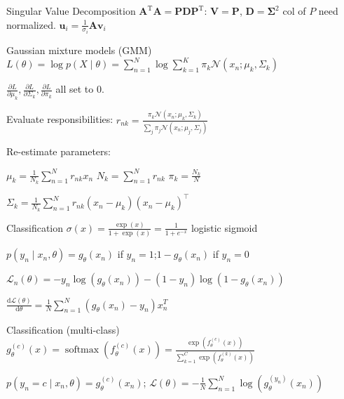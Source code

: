\documentclass[UTF8,a4paper]{article}
\begin{document}
\begin{multicols}{3}
\begin{cheatsheetblock}{Singular Value Decomposition}
    $\bm{A}^{\mathrm{T}} \bm{A}=\bm{P} \bm{D} \bm{P}^{\mathrm{T}}$: \hfill $\bm{V} = \bm{P}$, $\bm{D} = \bm{\Sigma}^2$ \hfill col of $P$ need normalized.
    $\bm{u}_i = \frac{1}{\sigma_i} \bm{A} \bm{v}_i$

\end{cheatsheetblock}

\begin{cheatsheetblock}{Gaussian mixture models (GMM)}
    $L(\theta)=\log p(X \mid \theta)=\sum_{n=1}^N \log \sum_{k=1}^K \pi_k \mathcal{N}\left(x_n ; \mu_k, \Sigma_k\right)$

    $\frac{\partial L}{\partial \mu_k}, \frac{\partial L}{\partial \Sigma_k} , \frac{\partial L}{\partial \pi_k}$ all set to 0.

    Evaluate responsibilities: \quad $r_{n k}=\frac{\pi_k \mathcal{N}\left(x_n ; \mu_k, \Sigma_k\right)}{\sum_j \pi_j \mathcal{N}\left(x_n ; \mu_j, \Sigma_j\right)}$

    Re-estimate parameters:

    $\mu_k=\frac{1}{N_k} \sum_{n=1}^N r_{n k} x_n$ \hfill $N_k=\sum_{n=1}^N r_{n k}$ \hfill $\pi_k = \frac{N_k}{N}$

    $\Sigma_k=\frac{1}{N_k} \sum_{n=1}^N r_{n k}\left(x_n-\mu_k\right)\left(x_n-\mu_k\right)^{\top}$
\end{cheatsheetblock}

\begin{cheatsheetblock}{Classification}
    $\sigma(x) = \frac{\exp(x)}{1 + \exp(x)} = \frac{1}{1 + e^{-x}}$ \hfill logistic sigmoid

    $p(y_n \mid x_n, \theta)=g_\theta(x_n)$ if $y_n=1$;\quad $1-g_\theta(x_n)$ if $y_n=0$

    $\mathscr{L}_n(\theta)=-y_n \log \left(g_\theta\left(x_n\right)\right)-\left(1-y_n\right) \log \left(1-g_\theta\left(x_n\right)\right)$

    $\frac{\mathrm{d} \mathscr{L}(\theta)}{\mathrm{d} \theta}=\frac{1}{N} \sum_{n=1}^N\left(g_\theta\left(x_n\right)-y_n\right) x_n^T$
\end{cheatsheetblock}

\begin{cheatsheetblock}{Classification (multi-class)}
    $g_\theta^{(c)}(x)=\operatorname{softmax}\left(f_\theta^{(c)}(x)\right)=\frac{\exp \left(f_\theta^{(c)}(x)\right)}{\sum_{k=1}^C \exp \left(f_\theta^{(k)}(x)\right)}$

    $p\left(y_n=c \mid x_n, \theta\right)=g_\theta^{(c)}\left(x_n\right)$; $\mathscr{L}(\theta)=-\frac{1}{N} \sum_{n=1}^N \log \left(g_\theta^{\left(y_n\right)}\left(x_n\right)\right)$


\end{cheatsheetblock}
\end{multicols}
\end{document}
